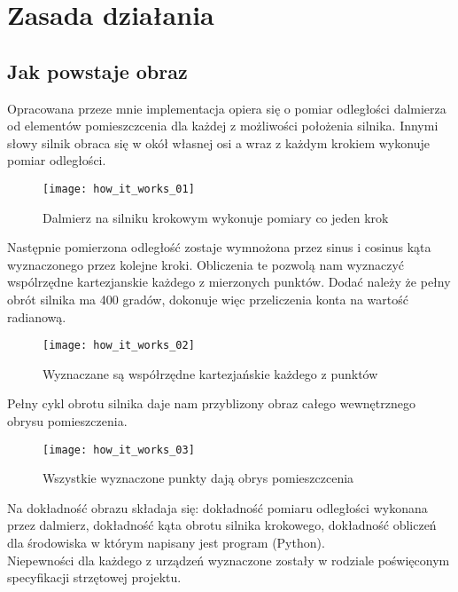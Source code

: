 \section {Zasada działania}

\subsection {Jak powstaje obraz}

Opracowana przeze mnie implementacja opiera się o pomiar odległości dalmierza od elementów pomieszczcenia dla każdej z możliwości położenia silnika. Innymi słowy silnik obraca się w okół własnej osi a wraz z każdym krokiem wykonuje pomiar odległości.\\

\begin{figure}[h]
    \centering
    \texttt{[image: how\_it\_works\_01]}
    \caption{Dalmierz na silniku krokowym wykonuje pomiary co jeden krok}
    \label{fig:how_it_works_01}
\end{figure}

Następnie pomierzona odległość zostaje wymnożona przez sinus i cosinus kąta wyznaczonego przez kolejne kroki. Obliczenia te pozwolą nam wyznaczyć wspólrzędne kartezjanskie każdego z mierzonych punktów. Dodać należy że pełny obrót silnika ma 400 gradów, dokonuje więc przeliczenia konta na wartość radianową.\\

\begin{figure}[h]
    \centering
    \texttt{[image: how\_it\_works\_02]}
    \caption{Wyznaczane są współrzędne kartezjańskie każdego z punktów}
    \label{fig:how_it_works_02}
\end{figure}

Pełny cykl obrotu silnika daje nam przyblizony obraz całego wewnętrznego obrysu pomieszczenia.\\

\begin{figure}[h]
    \centering
    \texttt{[image: how\_it\_works\_03]}
    \caption{Wszystkie wyznaczone punkty dają obrys pomieszczcenia}
    \label{fig:how_it_works_03}
\end{figure}

Na dokładność obrazu składaja się: dokładność pomiaru odległości wykonana przez dalmierz, dokładność kąta obrotu silnika krokowego, dokładność obliczeń dla środowiska w którym napisany jest program (Python).\\

Niepewności dla każdego z urządzeń wyznaczone zostały w rodziale poświęconym specyfikacji strzętowej projektu.\\